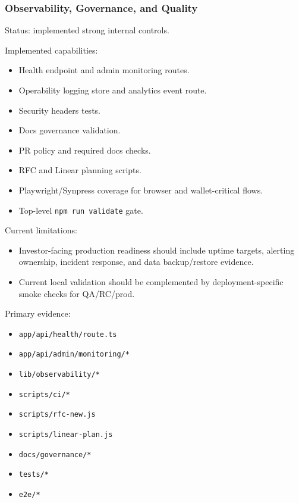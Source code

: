 \documentclass[
  10pt,
  letterpaper,
]{article}
\providecommand{\tightlist}{%
  \setlength{\itemsep}{0pt}\setlength{\parskip}{0pt}}
\let\oldtexttt\texttt
\renewcommand{\texttt}[1]{\oldtexttt{\small #1}}
\begin{document}
\subsubsection{Observability, Governance, and
Quality}\label{observability-governance-and-quality}

Status: implemented strong internal controls.

Implemented capabilities:

\begin{itemize}
\tightlist
\item
  Health endpoint and admin monitoring routes.
\item
  Operability logging store and analytics event route.
\item
  Security headers tests.
\item
  Docs governance validation.
\item
  PR policy and required docs checks.
\item
  RFC and Linear planning scripts.
\item
  Playwright/Synpress coverage for browser and wallet-critical flows.
\item
  Top-level \texttt{npm\ run\ validate} gate.
\end{itemize}

Current limitations:

\begin{itemize}
\tightlist
\item
  Investor-facing production readiness should include uptime targets,
  alerting ownership, incident response, and data backup/restore
  evidence.
\item
  Current local validation should be complemented by deployment-specific
  smoke checks for QA/RC/prod.
\end{itemize}

Primary evidence:

\begin{itemize}
\tightlist
\item
  \texttt{app/api/health/route.ts}
\item
  \texttt{app/api/admin/monitoring/*}
\item
  \texttt{lib/observability/*}
\item
  \texttt{scripts/ci/*}
\item
  \texttt{scripts/rfc-new.js}
\item
  \texttt{scripts/linear-plan.js}
\item
  \texttt{docs/governance/*}
\item
  \texttt{tests/*}
\item
  \texttt{e2e/*}
\end{itemize}
\end{document}
